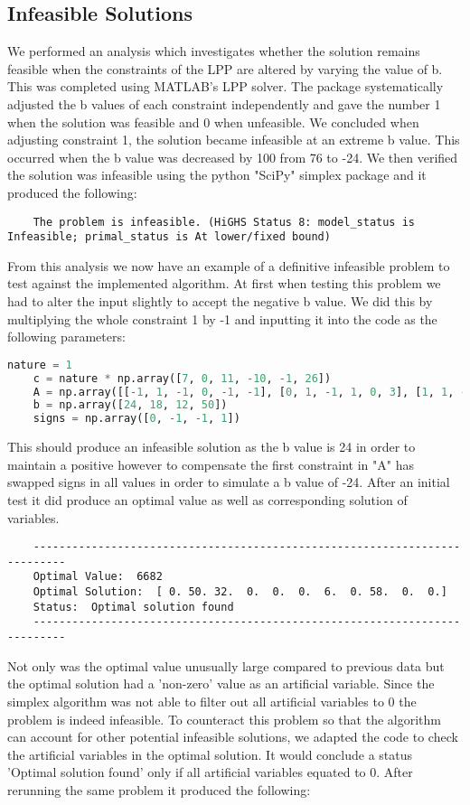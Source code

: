 \documentclass{article}
\numberwithin{equation}{section}
\begin{document}
\subsection{Infeasible Solutions}
We performed an analysis which investigates whether the solution remains feasible when the constraints of the LPP are altered by varying the value of b.  This was completed using MATLAB's LPP solver. The package systematically adjusted the b values of each constraint independently and gave the number 1 when the solution was feasible and 0 when unfeasible. We concluded when adjusting constraint 1, the solution became infeasible at an extreme b value. This occurred when the b value was decreased by 100 from 76 to -24. We then verified the solution was infeasible using the python "SciPy" simplex package and it produced the following:
\begin{lstlisting}
    The problem is infeasible. (HiGHS Status 8: model_status is Infeasible; primal_status is At lower/fixed bound)
\end{lstlisting}
From this analysis we now have an example of a definitive infeasible problem to test against the implemented algorithm. At first when testing this problem we had to alter the input slightly to accept the negative b value. We did this by multiplying the whole constraint 1 by -1 and inputting it into the code as the following parameters:
\begin{lstlisting}[language=Python, basicstyle=\scriptsize, frame=single]
    nature = 1                                             
    c = nature * np.array([7, 0, 11, -10, -1, 26])
    A = np.array([[-1, 1, -1, 0, -1, -1], [0, 1, -1, 1, 0, 3], [1, 1, -3, 1, 1, 0], [1, 1, 0, 0, 0, 1]])
    b = np.array([24, 18, 12, 50])
    signs = np.array([0, -1, -1, 1])
\end{lstlisting}
This should produce an infeasible solution as the b value is 24 in order to maintain a positive however to compensate the first constraint in "A" has swapped signs in all values in order to simulate a b value of -24. After an initial test it did produce an optimal value as well as corresponding solution of variables. 
\begin{lstlisting}
    ---------------------------------------------------------------------------
    Optimal Value:  6682
    Optimal Solution:  [ 0. 50. 32.  0.  0.  0.  6.  0. 58.  0.  0.]
    Status:  Optimal solution found
    ---------------------------------------------------------------------------
\end{lstlisting}
Not only was the optimal value unusually large compared to previous data but the optimal solution had a 'non-zero' value as an artificial variable. Since the simplex algorithm was not able to filter out all artificial variables to 0 the problem is indeed infeasible. To counteract this problem so that the algorithm can account for other potential infeasible solutions, we adapted the code to check the artificial variables in the optimal solution. It would conclude a status  'Optimal solution found' only if all artificial variables equated to 0. After rerunning the same problem it produced the following:
\end{document}
